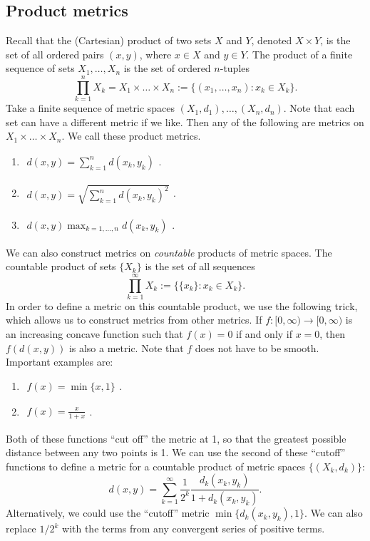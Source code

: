 \documentclass[12pt]{amsart}         %
\theoremstyle{remark}
\begin{document}
\subsection{Product metrics}

Recall that the (Cartesian) product of two sets $X$ and $Y$, denoted $X \times Y$, is the set of all ordered pairs $(x,y)$, where $x \in X$ and $y \in Y$. The product of a finite sequence of sets $X_1, \dots, X_n$ is the set of ordered $n$-tuples
\[
\prod_{k=1}^n X_k = X_1 \times \dots \times X_n := \{ (x_1, \dots, x_n)  : x_k \in X_k \}.
\]
Take a finite sequence of metric spaces $(X_1, d_1), \dots, (X_n, d_n)$. Note that each set can have a different metric if we like. Then any of the following are metrics on $X_1 \times \dots \times X_n$. We call these product metrics.
\begin{enumerate}
    \item $\begin{aligned}d(x, y) = \sum_{k=1}^n d(x_k, y_k) \end{aligned}$.
    \item $\begin{aligned}d(x, y) = \sqrt{ \sum_{k=1}^n d(x_k, y_k)^2  } \end{aligned}$.
    \item $\begin{aligned}d(x,y) \max_{k = 1, \dots, n} d(x_k, y_k) \end{aligned}$.
\end{enumerate}

We can also construct metrics on \emph{countable} products of metric spaces. The countable product of sets $\{X_k\}$ is the set of all sequences
\[
\prod_{k=1}^\infty X_k := \Big\{ \{x_k\} : x_k \in X_k \Big\}.
\]
In order to define a metric on this countable product, we use the following trick, which allows us to construct metrics from other metrics. If $f:[0, \infty) \rightarrow [0, \infty)$ is an increasing concave function such that $f(x)=0$ if and only if $x=0$, then $f(d(x,y))$ is also a metric. Note that $f$ does not have to be smooth. Important examples are:
\begin{enumerate}
    \item $\begin{aligned}f(x) = \min\{x, 1\}\end{aligned}$.
    \item $\begin{aligned}f(x) = \frac{x}{1+x}\end{aligned}$.
\end{enumerate}
Both of these functions ``cut off'' the metric at 1, so that the greatest possible distance between any two points is 1. We can use the second of these ``cutoff'' functions to define a metric for a countable product of metric spaces $\{(X_k, d_k)\}$:
\[
d(x,y) = \sum_{k = 1}^\infty \frac{1}{2^k} \frac{d_k(x_k, y_k)}{1+d_k(x_k, y_k)}.
\]
Alternatively, we could use the ``cutoff'' metric $\min\{d_k(x_k, y_k), 1\}$. We can also replace $1/2^k$ with the terms from any convergent series of positive terms.
\end{document}
